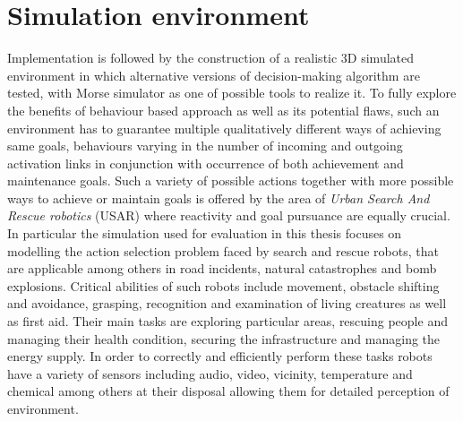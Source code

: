 \section{Simulation environment}
Implementation is followed by the construction of a realistic 3D simulated environment in which alternative versions of decision-making algorithm are tested, with Morse simulator \cite{morse} as one of possible tools to realize it. To fully explore the benefits of behaviour based approach as well as its potential flaws, such an environment has to guarantee multiple qualitatively different ways of achieving same goals, behaviours varying in the number of incoming and outgoing activation links in conjunction with occurrence of both achievement and maintenance goals. Such a variety of possible actions together with more possible ways to achieve or maintain goals is offered by the area of \textit{Urban Search And Rescue robotics} (USAR) \cite{usar} where reactivity and goal pursuance are equally crucial.
In particular the simulation used for evaluation in this thesis focuses on modelling the action selection problem faced by search and rescue robots, that are applicable among others in road incidents, natural catastrophes and bomb explosions. Critical abilities of such robots include movement, obstacle shifting and avoidance, grasping, recognition and examination of living creatures as well as first aid. Their main tasks are exploring particular areas, rescuing people and managing their health condition, securing the infrastructure and managing the energy supply. In order to correctly and efficiently perform these tasks robots have a variety of sensors including audio, video, vicinity, temperature and chemical among others at their disposal allowing them for detailed perception of environment. 
